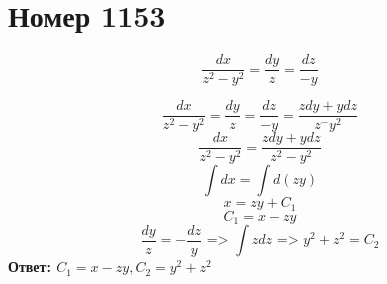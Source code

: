 \section*{Номер 1153}

$$ \dfrac{dx}{z^2 - y^2} = \dfrac{dy}{z} = \dfrac{dz}{-y} $$

\begin{solution}
    $$ \dfrac{dx}{z^2 - y^2} = \dfrac{dy}{z} = \dfrac{dz}{-y} = \dfrac{zdy + ydz}{z^ - y^2} $$
    $$ \dfrac{dx}{z^2 - y^2} = \dfrac{zdy + ydz}{z^2 - y^2} $$
    $$ \int dx = \int d(zy) $$
    $$ x = zy + C_1 $$
    $$ C_1 = x - zy $$
    $$ \dfrac{dy}{z} = - \dfrac{dz}{y} \text{ => } \int zdz \text{ => } y^2 + z^2 = C_2 $$
    \textbf{Ответ: $ C_1 = x - zy, C_2 = y^2 + z^2 $}

\end{solution}\pagebreak